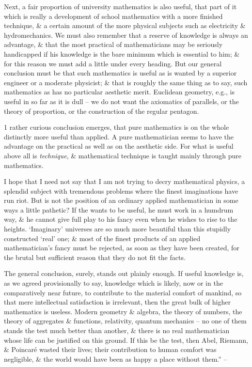 \documentclass{article}
\numberwithin{equation}{section}
\begin{document}
Next, a fair proportion of university mathematics is also useful, that part of it which is really a development of school mathematics with a more finished technique, \& a certain amount of the more physical subjects such as electricity \& hydromechanics. We must also remember that a reserve of knowledge is always an advantage, \& that the most practical of mathematicians may be seriously handicapped if his knowledge is the bare minimum which is essential to him; \& for this reason we must add a little under every heading. But our general conclusion must be that such mathematics is useful as is wanted by a superior engineer or a moderate physicist; \& that is roughly the same thing as to say, such mathematics as has no particular aesthetic merit. Euclidean geometry, e.g., is useful in so far as it is dull -- we do not want the axiomatics of parallels, or the theory of proportion, or the construction of the regular pentagon.

1 rather curious conclusion emerges, that pure mathematics is on the whole distinctly more useful than applied. A pure mathematician seems to have the advantage on the practical as well as on the aesthetic side. For what is useful above all is \textit{technique}, \& mathematical technique is taught mainly through pure mathematics.

I hope that I need not say that I am not trying to decry mathematical physics, a splendid subject with tremendous problems where the finest imaginations have run riot. But is not the position of an ordinary applied mathematician in some ways a little pathetic? If the wants to be useful, he must work in a humdrum way, \& he cannot give full play to his fancy even when he wishes to rise to the heights. `Imaginary' universes are so much more beautiful than this stupidly constructed `real' one; \& most of the finest products of an applied mathematician's fancy must be rejected, as soon as they have been created, for the brutal but sufficient reason that they do not fit the facts.

The general conclusion, surely, stands out plainly enough. If useful knowledge is, as we agreed provisionally to say, knowledge which is likely, now or in the comparatively near future, to contribute to the material comfort of mankind, so that mere intellectual satisfaction is irrelevant, then the great bulk of higher mathematics is useless. Modern geometry \& algebra, the theory of numbers, the theory of aggregates \& functions, relativity, quantum mechanics -- no one of them stands the test much better than another, \& there is no real mathematician whose life can be justified on this ground. If this be the test, then Abel, Riemann, \& Poincar\'e wasted their lives; their contribution to human comfort was negligible, \& the world would have been as happy a place without them.'' -- \cite[pp. 133--136]{Hardy1992}
\end{document}
